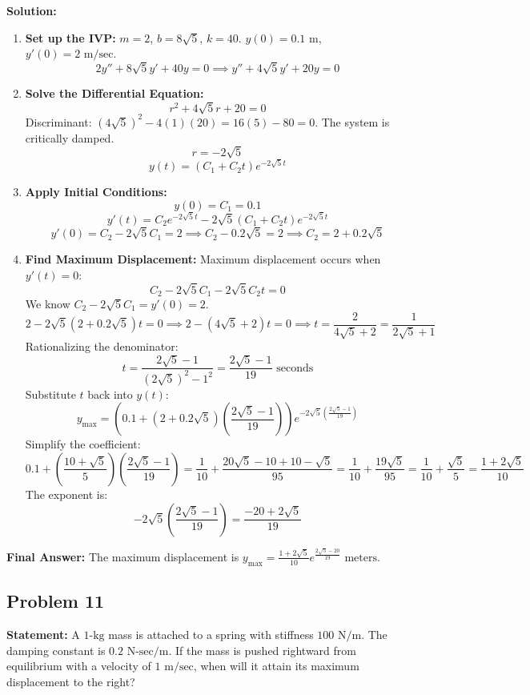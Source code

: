 \documentclass[11pt]{article}
\begin{document}
\textbf{Solution:}
\begin{enumerate}
    \item \textbf{Set up the IVP:}
    $m = 2$, $b = 8\sqrt{5}$, $k = 40$. $y(0) = 0.1 \text{ m}$, $y'(0) = 2 \text{ m/sec}$.
    \[ 2y'' + 8\sqrt{5}y' + 40y = 0 \implies y'' + 4\sqrt{5}y' + 20y = 0 \]
    
    \item \textbf{Solve the Differential Equation:}
    \[ r^2 + 4\sqrt{5}r + 20 = 0 \]
    Discriminant: $(4\sqrt{5})^2 - 4(1)(20) = 16(5) - 80 = 0$. The system is critically damped.
    \[ r = -2\sqrt{5} \]
    \[ y(t) = (C_1 + C_2 t)e^{-2\sqrt{5}t} \]
    
    \item \textbf{Apply Initial Conditions:}
    \[ y(0) = C_1 = 0.1 \]
    \[ y'(t) = C_2 e^{-2\sqrt{5}t} - 2\sqrt{5}(C_1 + C_2 t)e^{-2\sqrt{5}t} \]
    \[ y'(0) = C_2 - 2\sqrt{5}C_1 = 2 \implies C_2 - 0.2\sqrt{5} = 2 \implies C_2 = 2 + 0.2\sqrt{5} \]
    
    \item \textbf{Find Maximum Displacement:}
    Maximum displacement occurs when $y'(t) = 0$:
    \[ C_2 - 2\sqrt{5}C_1 - 2\sqrt{5}C_2 t = 0 \]
    We know $C_2 - 2\sqrt{5}C_1 = y'(0) = 2$.
    \[ 2 - 2\sqrt{5}(2 + 0.2\sqrt{5})t = 0 \implies 2 - (4\sqrt{5} + 2)t = 0 \implies t = \frac{2}{4\sqrt{5} + 2} = \frac{1}{2\sqrt{5} + 1} \]
    Rationalizing the denominator:
    \[ t = \frac{2\sqrt{5} - 1}{(2\sqrt{5})^2 - 1^2} = \frac{2\sqrt{5} - 1}{19} \text{ seconds} \]
    Substitute $t$ back into $y(t)$:
    \[ y_{\text{max}} = \left(0.1 + (2 + 0.2\sqrt{5})\left(\frac{2\sqrt{5} - 1}{19}\right)\right) e^{-2\sqrt{5}\left(\frac{2\sqrt{5} - 1}{19}\right)} \]
    Simplify the coefficient:
    \[ 0.1 + \left(\frac{10 + \sqrt{5}}{5}\right)\left(\frac{2\sqrt{5} - 1}{19}\right) = \frac{1}{10} + \frac{20\sqrt{5} - 10 + 10 - \sqrt{5}}{95} = \frac{1}{10} + \frac{19\sqrt{5}}{95} = \frac{1}{10} + \frac{\sqrt{5}}{5} = \frac{1 + 2\sqrt{5}}{10} \]
    The exponent is:
    \[ -2\sqrt{5}\left(\frac{2\sqrt{5} - 1}{19}\right) = \frac{-20 + 2\sqrt{5}}{19} \]
\end{enumerate}
\textbf{Final Answer:} The maximum displacement is $y_{\text{max}} = \frac{1 + 2\sqrt{5}}{10} e^{\frac{2\sqrt{5} - 20}{19}} \text{ meters}$.

\subsection{Problem 11}
\textbf{Statement:} A $1\text{-kg}$ mass is attached to a spring with stiffness $100 \text{ N/m}$. The damping constant is $0.2 \text{ N-sec/m}$. If the mass is pushed rightward from equilibrium with a velocity of $1 \text{ m/sec}$, when will it attain its maximum displacement to the right?
\end{document}
